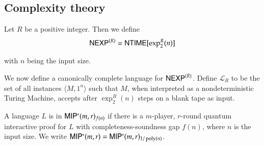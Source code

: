 \subsection{Complexity theory}

\begin{definition}
	Let $R$ be a positive integer. Then we define
	\[
		{\sf NEXP}^{(R)} = {\sf NTIME}[\exp^R_2(n)]
	\]
\end{definition}
with $n$ being the input size. 

We now define a canonically complete language for ${\sf NEXP}^{(R)}$. Define $\mathcal{L}_R$ to be the set of all instances $\langle M, 1^n \rangle$ such that $M$, when interpreted as a nondeterministic Turing Machine, accepts after $\exp^R_2(n)$ steps on a blank tape as input.

\begin{definition}[$\MIPstar$]
	A language $L$ is in ${\sf MIP^*}(m,r)_{f(n)}$ if there is a $m$-player, $r$-round quantum interactive proof for $L$ with completeness-soundness gap $f(n)$, where $n$ is the input size. We write ${\sf MIP^*}(m,r) = {\sf MIP^*}(m,r)_{1/\operatorname{poly}(n)}$.
\end{definition}


